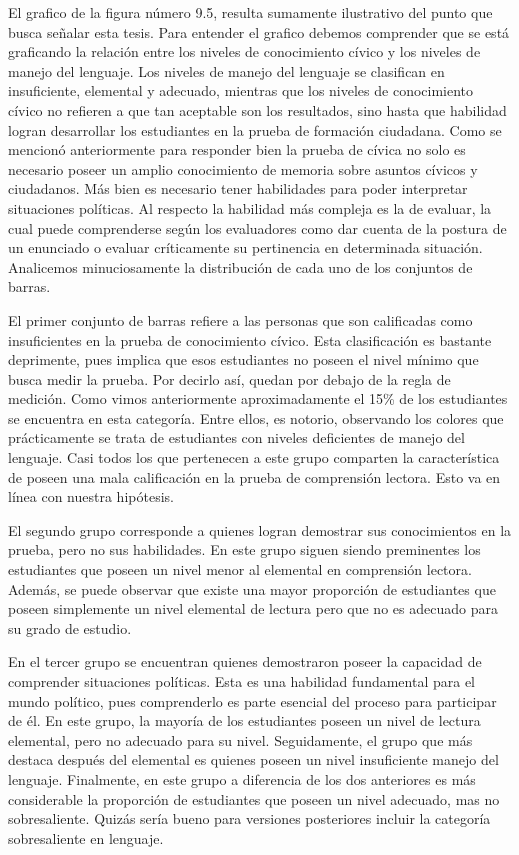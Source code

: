 \documentclass[12pt,twoside]{templates/facsothesis}
\begin{document}
El grafico de la figura número 9.5, resulta sumamente ilustrativo del punto que busca señalar esta tesis. Para entender el grafico debemos comprender que se está graficando la relación entre los niveles de conocimiento cívico y los niveles de manejo del lenguaje. Los niveles de manejo del lenguaje se clasifican en insuficiente, elemental y adecuado, mientras que los niveles de conocimiento cívico no refieren a que tan aceptable son los resultados, sino hasta que habilidad logran desarrollar los estudiantes en la prueba de formación ciudadana. Como se mencionó anteriormente para responder bien la prueba de cívica no solo es necesario poseer un amplio conocimiento de memoria sobre asuntos cívicos y ciudadanos. Más bien es necesario tener habilidades para poder interpretar situaciones políticas. Al respecto la habilidad más compleja es la de evaluar, la cual puede comprenderse según los evaluadores como dar cuenta de la postura de un enunciado o evaluar críticamente su pertinencia en determinada situación. Analicemos minuciosamente la distribución de cada uno de los conjuntos de barras.

El primer conjunto de barras refiere a las personas que son calificadas como insuficientes en la prueba de conocimiento cívico. Esta clasificación es bastante deprimente, pues implica que esos estudiantes no poseen el nivel mínimo que busca medir la prueba. Por decirlo así, quedan por debajo de la regla de medición. Como vimos anteriormente aproximadamente el 15\% de los estudiantes se encuentra en esta categoría. Entre ellos, es notorio, observando los colores que prácticamente se trata de estudiantes con niveles deficientes de manejo del lenguaje. Casi todos los que pertenecen a este grupo comparten la característica de poseen una mala calificación en la prueba de comprensión lectora. Esto va en línea con nuestra hipótesis.

El segundo grupo corresponde a quienes logran demostrar sus conocimientos en la prueba, pero no sus habilidades. En este grupo siguen siendo preminentes los estudiantes que poseen un nivel menor al elemental en comprensión lectora. Además, se puede observar que existe una mayor proporción de estudiantes que poseen simplemente un nivel elemental de lectura pero que no es adecuado para su grado de estudio.

En el tercer grupo se encuentran quienes demostraron poseer la capacidad de comprender situaciones políticas. Esta es una habilidad fundamental para el mundo político, pues comprenderlo es parte esencial del proceso para participar de él. En este grupo, la mayoría de los estudiantes poseen un nivel de lectura elemental, pero no adecuado para su nivel. Seguidamente, el grupo que más destaca después del elemental es quienes poseen un nivel insuficiente manejo del lenguaje. Finalmente, en este grupo a diferencia de los dos anteriores es más considerable la proporción de estudiantes que poseen un nivel adecuado, mas no sobresaliente. Quizás sería bueno para versiones posteriores incluir la categoría sobresaliente en lenguaje.
\end{document}
